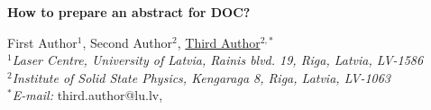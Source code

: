 \documentclass[10pt,a5paper]{article}
\begin{document}
\begin{center}
    \begin{large}   %
    \textbf{How to prepare an abstract for DOC?}\\
    \end{large}
\begin{small}                    %
\vspace*{.15cm} First Author$^1$, Second Author$^2$, \underline{Third Author}$^{2,*}$  %
\vspace*{.05cm}
\\\textit{$^1$Laser Centre, University of Latvia, Rainis blvd. 19, Riga, Latvia, LV-1586}
\\\textit{$^2$Institute of Solid State Physics,
Kengaraga 8, Riga, Latvia, LV-1063}
\\\textit{$^*$E-mail:} third.author@lu.lv, %
\end{small}
\end{center}
\vspace*{.1cm}
\end{document}
